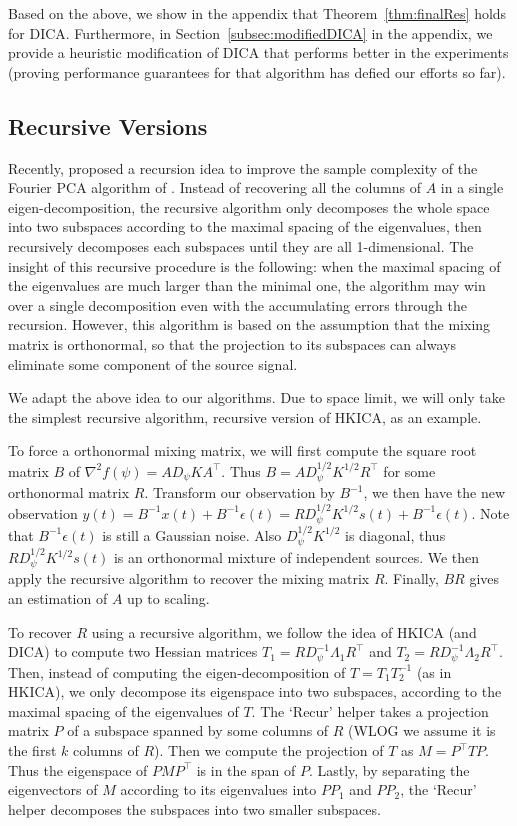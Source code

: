 \documentclass{article}
\theoremstyle{definition}
\newcommand{\eps}{\epsilon}
\begin{document}
Based on the above, we show in the appendix that Theorem~\ref{thm:finalRes} holds for DICA.
Furthermore, in Section~\ref{subsec:modifiedDICA} in the appendix, we provide a heuristic modification of DICA that performs better in the experiments (proving performance guarantees for that algorithm has defied our efforts so far).

\subsection{Recursive Versions}
Recently, \citet{vempala2014max} proposed a recursion idea to improve the sample complexity of the Fourier PCA algorithm of \citet{goyal2014fourier}. 
Instead of recovering all the columns of $A$ in a single eigen-decomposition, the recursive algorithm only decomposes the whole space into two subspaces according to the maximal spacing of the eigenvalues, 
then recursively decomposes each subspaces until they are all 1-dimensional.
The insight of this recursive procedure is the following: when the maximal spacing of the eigenvalues are much larger than the minimal one, the algorithm may win over a single decomposition even with the accumulating errors through the recursion.
However, this algorithm is based on the assumption that the mixing matrix is orthonormal, so that the projection to its subspaces can always eliminate some component of the source signal. 

We adapt the above idea to our algorithms. Due to space limit, we will only take the simplest recursive algorithm, recursive version of HKICA, as an example.

To force a orthonormal mixing matrix, we will first compute the square root matrix $B$ of  $\nabla^2f(\psi) = AD_{\psi}KA^{\top}$. 
Thus $B = AD_{\psi}^{1/2}K^{1/2}R^{\top}$ for some orthonormal matrix $R$. 
Transform our observation by $B^{-1}$, we then have the new observation $y(t) = B^{-1}x(t) + B^{-1}\eps(t) = RD_{\psi}^{1/2}K^{1/2}s(t) + B^{-1}\eps(t)$. 
Note that $B^{-1}\eps(t)$ is still a Gaussian noise. Also $D_{\psi}^{1/2}K^{1/2}$ is diagonal, thus $RD_{\psi}^{1/2}K^{1/2}s(t)$ is an orthonormal mixture of independent sources.
We then apply the recursive algorithm to recover the mixing matrix $R$. Finally, $BR$ gives an estimation of $A$ up to scaling.

To recover $R$ using a recursive algorithm, we follow the idea of HKICA (and DICA) to compute two Hessian matrices $T_1 = RD_{\psi}^{-1}\Lambda_1R^{\top}$ and $T_2 = RD_{\psi}^{-1}\Lambda_2R^{\top}$. 
Then, instead of computing the eigen-decomposition of $T = T_1 T_2^{-1}$ (as in HKICA), we only decompose its eigenspace into two subspaces, according to the maximal spacing of the eigenvalues of $T$. The `Recur' helper takes a projection matrix $P$ of a subspace spanned
by some columns of $R$ (WLOG we assume it is the first $k$ columns of $R$). Then we compute the projection of $T$ as $M = P^{\top}TP$. Thus the eigenspace of $PMP^{\top}$ is in the span of $P$. 
Lastly, by separating the eigenvectors of $M$ according to its eigenvalues into $PP_1$ and $PP_2$, the `Recur' helper decomposes the subspaces into two smaller subspaces.  
\end{document}
